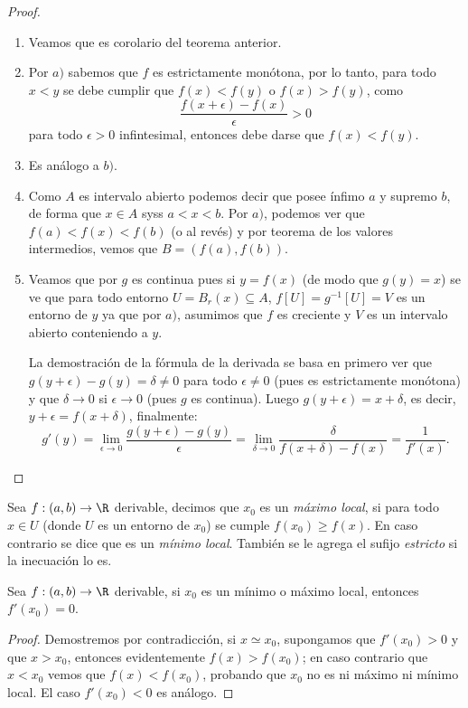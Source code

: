 \documentclass[11pt,oneside,a4paper]{book}
\begin{document}
\begin{proof}
\begin{enumerate}[$a)$]
\item Veamos que es corolario del teorema anterior.
\item Por $a)$ sabemos que $f$ es estrictamente monótona, por lo tanto, para todo $x\lt y$ se debe cumplir que $f(x)\lt f(y)$ o $f(x)\gt f(y)$, como
$$\frac{f(x+\epsilon)-f(x)}{\epsilon}\gt 0$$
para todo $\epsilon\gt 0$ infintesimal, entonces debe darse que $f(x)\lt f(y)$.
\item Es análogo a $b)$.
\item Como $A$ es intervalo abierto podemos decir que posee ínfimo $a$ y supremo $b$, de forma que $x\in A$ syss $a\lt x\lt b$. Por $a)$, podemos ver que $f(a)\lt f(x)\lt f(b)$ (o al revés) y por teorema de los valores intermedios, vemos que $B=(f(a),f(b))$.
\item Veamos que por $g$ es continua pues si $y=f(x)$ (de modo que $g(y)=x$) se ve que para todo entorno $U=B_r(x)\subseteq A$, $f[U]=g^{-1}[U]=V$ es un entorno de $y$ ya que por $a)$, asumimos que $f$ es creciente y $V$ es un intervalo abierto conteniendo a $y$.

La demostración de la fórmula de la derivada se basa en primero ver que $g(y+\epsilon)-g(y)=\delta\neq 0$ para todo $\epsilon\neq 0$ (pues es estrictamente monótona) y que $\delta\to 0$ si $\epsilon\to 0$ (pues $g$ es continua). Luego $g(y+\epsilon)=x+\delta$, es decir, $y+\epsilon=f(x+\delta)$, finalmente:
$$g'(y)=\lim_{\epsilon\to 0}\frac{g(y+\epsilon)-g(y)}{\epsilon}=\lim_{\delta\to 0}\frac{\delta}{f(x+\delta)-f(x)}=\frac{1}{f'(x)}.$$
\end{enumerate}
\end{proof}
\begin{mydef}
Sea $f:(a,b)\rightarrow\R$ derivable, decimos que $x_0$ es un \textit{máximo local}, si para todo $x\in U$ (donde $U$ es un entorno de $x_0$) se cumple $f(x_0)\geq f(x)$. En caso contrario se dice que es un \textit{mínimo local}. También se le agrega el sufijo \textit{estricto} si la inecuación lo es.
\end{mydef}
\begin{thm}\label{thm:local-min-max}
Sea $f:(a,b)\rightarrow\R$ derivable, si $x_0$ es un mínimo o máximo local, entonces $f'(x_0)=0$.
\end{thm}
\begin{proof}
Demostremos por contradicción, si $x\simeq x_0$, supongamos que $f'(x_0)\gt 0$ y que $x\gt x_0$, entonces evidentemente $f(x)\gt f(x_0)$; en caso contrario que $x\lt x_0$ vemos que $f(x)\lt f(x_0)$, probando que $x_0$ no es ni máximo ni mínimo local. El caso $f'(x_0)\lt 0$ es análogo.
\end{proof}
\end{document}
